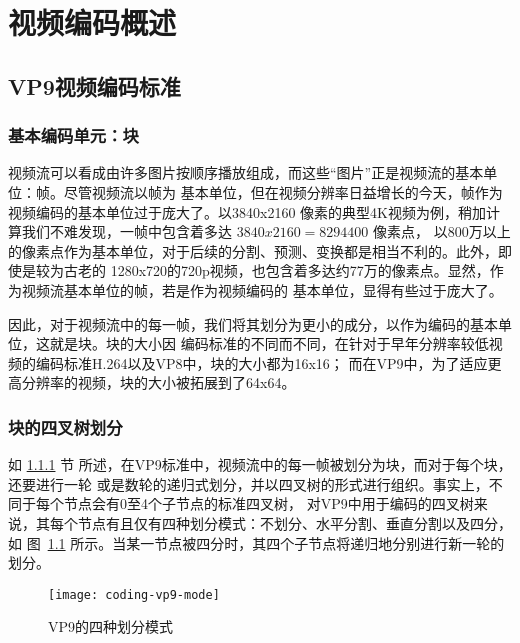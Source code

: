 \chapter{视频编码概述}
\label{cha:coding}

\section{VP9视频编码标准}
\label{sec:vp9}


\subsection{基本编码单元：块}
\label{sec:block}

视频流可以看成由许多图片按顺序播放组成，而这些“图片”正是视频流的基本单位：帧。尽管视频流以帧为
基本单位，但在视频分辨率日益增长的今天，帧作为视频编码的基本单位过于庞大了。以3840x2160
像素的典型4K视频为例，稍加计算我们不难发现，一帧中包含着多达 $3840x2160 = 8294400$ 像素点，
以800万以上的像素点作为基本单位，对于后续的分割、预测、变换都是相当不利的。此外，即使是较为古老的
1280x720的720p视频，也包含着多达约77万的像素点。显然，作为视频流基本单位的帧，若是作为视频编码的
基本单位，显得有些过于庞大了。

因此，对于视频流中的每一帧，我们将其划分为更小的成分，以作为编码的基本单位，这就是块。块的大小因
编码标准的不同而不同，在针对于早年分辨率较低视频的编码标准H.264以及VP8中，块的大小都为16x16；
而在VP9中，为了适应更高分辨率的视频，块的大小被拓展到了64x64。



\subsection{块的四叉树划分}

如 \ref{sec:block} 节 所述，在VP9标准中，视频流中的每一帧被划分为块，而对于每个块，还要进行一轮
或是数轮的递归式划分，并以四叉树的形式进行组织。事实上，不同于每个节点会有0至4个子节点的标准四叉树，
对VP9中用于编码的四叉树来说，其每个节点有且仅有四种划分模式：不划分、水平分割、垂直分割以及四分，如
图~\ref{fig:coding-vp9-mode} 所示。当某一节点被四分时，其四个子节点将递归地分别进行新一轮的划分。

\begin{figure}[H] %
  \centering
  \texttt{[image: coding-vp9-mode]}
  \caption{VP9的四种划分模式}
  \label{fig:coding-vp9-mode}
\end{figure}

